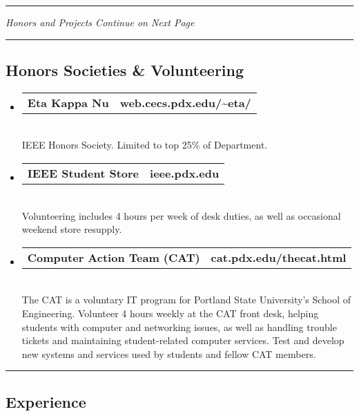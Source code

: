 \documentclass[10pt,letterpaper]{article}
\makeatletter
\newcommand{\headerrow}[2]
{\begin{tabular*}{\linewidth}{l@{\extracolsep{\fill}}r}
	#1 &
	#2 \\
\end{tabular*}}
\makeatother
\begin{document}
\hrule
\begin{center}
{\emph{Honors and Projects Continue on Next Page}}

\end{center}

\newpage

\hrule
\vspace{-0.4em}
\subsection*{Honors Societies \& Volunteering}
\begin{itemize}
  \item
	\headerrow
		{\textbf{Eta Kappa Nu}}
		{\textbf{web.cecs.pdx.edu/\textasciitilde eta/}}
	\\
  IEEE Honors Society. Limited to top 25\% of Department.

  \item
	\headerrow
		{\textbf{IEEE Student Store}}
		{\textbf{ieee.pdx.edu}}
	\\
  Volunteering includes 4 hours per week of desk duties, as well as occasional weekend store resupply.

  \item
  \headerrow
    {\textbf{Computer Action Team (CAT)}}
		{\textbf{cat.pdx.edu/thecat.html}}
	\\
  The CAT is a voluntary IT program for Portland State University's School of Engineering. Volunteer 4 hours weekly at the CAT front desk, helping students with computer and networking issues, as well as handling trouble tickets and maintaining student-related computer services. Test and develop new systems and services used by students and fellow CAT members. 

\end{itemize}

\hrule
\vspace{-0.4em}
\subsection*{Experience}
\end{document}
